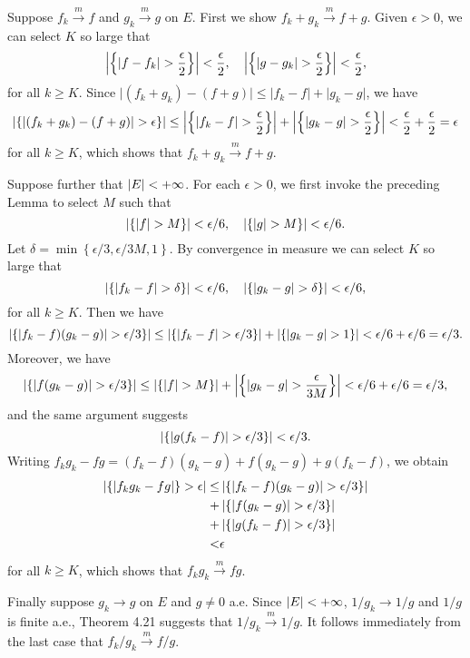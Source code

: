 \begin{exercise}{4.17}
  Suppose $f_k \xrightarrow{m} f$ and $g_k \xrightarrow{m} g$ on $E$.
  First we show $f_k + g_k \xrightarrow{m} f+g$.
  Given $\epsilon > 0$,
  we can select $K$ so large that
  \[
      \left\vert\left\{ \lvert f - f_k \rvert > \frac{\epsilon}{2} \right\}\right\vert < \frac{\epsilon}{2},
      \quad
      \left\vert\left\{ \lvert g - g_k \rvert > \frac{\epsilon}{2} \right\}\right\vert < \frac{\epsilon}{2},
  \]
  for all $k \ge K$.
  Since $\lvert (f_k + g_k) - (f+g) \rvert \le
  \lvert f_k - f \rvert + \lvert g_k - g \rvert$,
  we have
  \[
    \left\vert\left\{ \lvert (f_k + g_k) - (f+g) \rvert > \epsilon \right\}\right\vert \le
    \left\vert\left\{ \lvert f_k - f \rvert > \frac{\epsilon}{2} \right\}\right\vert
    + \left\vert\left\{ \lvert g_k - g \rvert > \frac{\epsilon}{2} \right\}\right\vert
    < \frac{\epsilon}{2} + \frac{\epsilon}{2} = \epsilon
  \]
  for all $k \ge K$, which shows that $f_k + g_k \xrightarrow{m} f + g$.

  Suppose further that $\left\vert E\right\vert < +\infty$.
  For each $\epsilon > 0$,
  we first invoke the preceding Lemma to select $M$ such that
  \[
    \left\vert\left\{ \lvert f \rvert > M \right\}\right\vert < \epsilon/6, \quad
    \left\vert\left\{ \lvert g \rvert > M \right\}\right\vert < \epsilon/6.
  \]
  Let $\delta = \min\left\{ \epsilon/3, \epsilon/3M, 1 \right\}$.
  By convergence in measure we can select $K$ so large that
  \[
    \left\vert\left\{ \lvert f_k - f \rvert > \delta \right\}\right\vert < \epsilon/6, \quad
    \left\vert\left\{ \lvert g_k - g \rvert > \delta \right\}\right\vert < \epsilon/6,
  \]
  for all $k \ge K$.
  Then we have
  \[
    \left\vert\left\{ \lvert f_k - f)(g_k - g) \rvert > \epsilon/3 \right\} \right\vert
    \le \left\vert\left\{ \lvert f_k - f \rvert > \epsilon/3 \right\}\right\vert
    + \left\vert\left\{ \lvert g_k - g \rvert > 1 \right\}\right\vert
    < \epsilon/6 + \epsilon/6 = \epsilon/3.
  \]
  Moreover, we have
  \[
    \left\vert\left\{ \lvert f (g_k - g) \rvert > \epsilon/3 \right\}\right\vert
    \le \left\vert\left\{ \lvert f \rvert > M \right\}\right\vert
    + \left\vert\left\{ \lvert g_k - g \rvert > \frac{\epsilon}{3M} \right\}\right\vert
    < \epsilon/6 + \epsilon/6 = \epsilon/3,
  \]
  and the same argument suggests
  \[
    \left\vert\left\{ \lvert g (f_k - f) \rvert > \epsilon/3 \right\}\right\vert < \epsilon/3.
  \]
  Writing $f_k g_k - fg = (f_k - f)(g_k - g) + f(g_k - g) + g(f_k - f)$,
  we obtain
  \[
    \begin{aligned}
      \left\vert\left\{ \lvert f_k g_k - fg \rvert \right\} > \epsilon\right\vert
      \le &\left\vert\left\{ \lvert f_k - f)(g_k - g) \rvert > \epsilon/3 \right\} \right\vert \\
      + &\left\vert\left\{ \lvert f (g_k - g) \rvert > \epsilon/3 \right\}\right\vert \\
      + &\left\vert\left\{ \lvert g (f_k - f) \rvert > \epsilon/3 \right\}\right\vert \\
      < &\epsilon
    \end{aligned}
  \]
  for all $k \ge K$, which shows that $f_k g_k \xrightarrow{m} fg$.

  Finally suppose $g_k \rightarrow g$ on $E$ and $g \neq 0$ a.e.
  Since $\left\vert E\right\vert < +\infty$, $1/g_k \rightarrow 1/g$ and $1/g$ is finite a.e.,
  Theorem 4.21 suggests that $1/g_k \xrightarrow{m} 1/g$.
  It follows immediately from the last case that $f_k/g_k \xrightarrow{m} f/g$.
\end{exercise}

